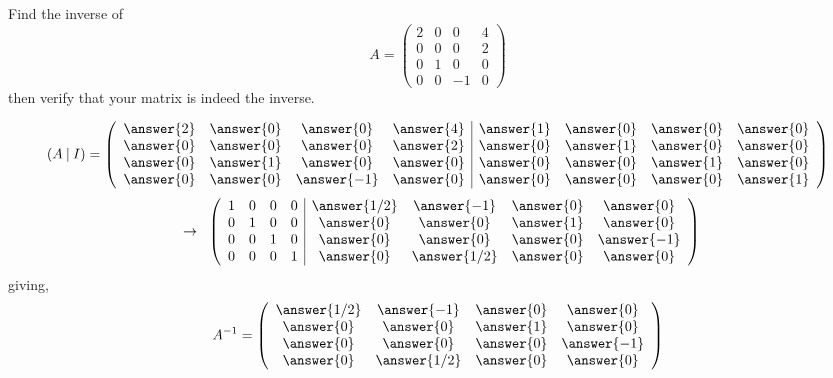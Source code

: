 \documentclass{ximera}
\author{Parisa Fatheddin}
\begin{document}
\begin{exercise}
Find the inverse of
\[A = \left(\begin{array}{cccc}
2 & 0 & 0 & 4\\
0 & 0 &0& 2\\
0& 1 & 0 & 0\\
0 & 0 & -1 & 0
\end{array}\right)
\]
then verify that your matrix is indeed the inverse.

\begin{prompt}
\[(A \hspace{.08cm}| \hspace{.08cm} I)= \left(\begin{array}{cccc|cccc}
\answer{2} & \answer{0} & \answer{0}& \answer{4} & \answer{1} & \answer{0} &\answer{0} & \answer{0}\\
\answer{0} & \answer{0} & \answer{0}& \answer{2} & \answer{0} & \answer{1} &\answer{0} & \answer{0}\\
\answer{0} & \answer{1} & \answer{0}& \answer{0} & \answer{0} & \answer{0} &\answer{1} & \answer{0}\\
\answer{0} & \answer{0} & \answer{-1}& \answer{0} & \answer{0} & \answer{0} &\answer{0} & \answer{1}
\end{array}\right)
\]
\[
\hspace{.2cm} \rightarrow \hspace{.2cm}
\left(\begin{array}{cccc|cccc}
1 & 0 & 0& 0 & \answer{1/2} & \answer{-1} &\answer{0} & \answer{0}\\
0 & 1 & 0& 0 & \answer{0} & \answer{0} &\answer{1} & \answer{0}\\
0 & 0 & 1& 0 & \answer{0} & \answer{0} &\answer{0} & \answer{-1}\\
0 & 0 & 0& 1 & \answer{0} & \answer{1/2} &\answer{0} & \answer{0}
\end{array}\right)
\]
giving,
\[A^{-1} = \left(\begin{array}{cccc}
\answer{1/2} & \answer{-1} &\answer{0} & \answer{0}\\
 \answer{0} & \answer{0} &\answer{1} & \answer{0}\\
 \answer{0} & \answer{0} &\answer{0} & \answer{-1}\\
 \answer{0} & \answer{1/2} &\answer{0} & \answer{0}
\end{array}\right)
\]


\end{prompt}
\end{exercise}
\end{document}
